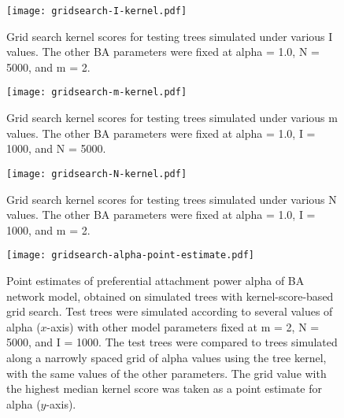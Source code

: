 \begin{figure}[ht]
  \centering
  \texttt{[image: gridsearch-I-kernel.pdf]}
  \caption{                                              
    Grid search kernel scores for testing trees simulated under various             
    \gls{I} values. The other \gls{BA} parameters were fixed at \gls{alpha} =
    1.0, \gls{N} = 5000, and \gls{m} = 2. 
  }        
  \label{fig:gridI}
\end{figure}

\begin{figure}[ht]
  \centering
  \texttt{[image: gridsearch-m-kernel.pdf]}
  \caption{                                              
    Grid search kernel scores for testing trees simulated under various             
    \gls{m} values. The other \gls{BA} parameters were fixed at \gls{alpha} =
    1.0, \gls{I} = 1000, and \gls{N} = 5000.
  }        
  \label{fig:gridm}
\end{figure}

\begin{figure}[ht]
  \centering
  \texttt{[image: gridsearch-N-kernel.pdf]}
  \caption{                                              
    Grid search kernel scores for testing trees simulated under various             
    \gls{N} values. The other \gls{BA} parameters were fixed at \gls{alpha} =
    1.0, \gls{I} = 1000, and \gls{m} = 2.
  }        
  \label{fig:gridN}
\end{figure}

\begin{figure}[ht]
  \centering
  \texttt{[image: gridsearch-alpha-point-estimate.pdf]}
  \caption[
      Point estimates of preferential attachment power \gls{alpha} of
      \acrlong{BA} network model, obtained on simulated trees with
      kernel-score-based grid search.]
  {
      Point estimates of preferential attachment power \gls{alpha} of
      \acrlong{BA} network model, obtained on simulated trees with
      kernel-score-based grid search. Test trees were simulated according to
      several values of \gls{alpha} ($x$-axis) with other model parameters
      fixed at \gls{m} = 2, \gls{N} = 5000, and \gls{I} = 1000. The test trees
      were compared to trees simulated along a narrowly spaced grid of
      \gls{alpha} values using the tree kernel, with the same values of the
      other parameters. The grid value with the highest median kernel score was
      taken as a point estimate for \gls{alpha} ($y$-axis).
  }
  \label{fig:gridptalpha}
\end{figure}

